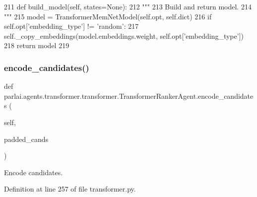 \begin{DoxyCode}
211     \textcolor{keyword}{def }build\_model(self, states=None):
212         \textcolor{stringliteral}{"""}
213 \textcolor{stringliteral}{        Build and return model.}
214 \textcolor{stringliteral}{        """}
215         model = TransformerMemNetModel(self.opt, self.dict)
216         \textcolor{keywordflow}{if} self.opt[\textcolor{stringliteral}{'embedding\_type'}] != \textcolor{stringliteral}{'random'}:
217             self.\_copy\_embeddings(model.embeddings.weight, self.opt[\textcolor{stringliteral}{'embedding\_type'}])
218         \textcolor{keywordflow}{return} model
219 
\end{DoxyCode}
\mbox{\label{classparlai_1_1agents_1_1transformer_1_1transformer_1_1TransformerRankerAgent_a6067345dff7fefda2809ea3bd63cd8fd}} 
\subsubsection{\texorpdfstring{encode\+\_\+candidates()}{encode\_candidates()}}
{\footnotesize\ttfamily def parlai.\+agents.\+transformer.\+transformer.\+Transformer\+Ranker\+Agent.\+encode\+\_\+candidates (\begin{DoxyParamCaption}\item[{}]{self,  }\item[{}]{padded\+\_\+cands }\end{DoxyParamCaption})}

\begin{DoxyVerb}Encode candidates.
\end{DoxyVerb}
 

Definition at line 257 of file transformer.\+py.


